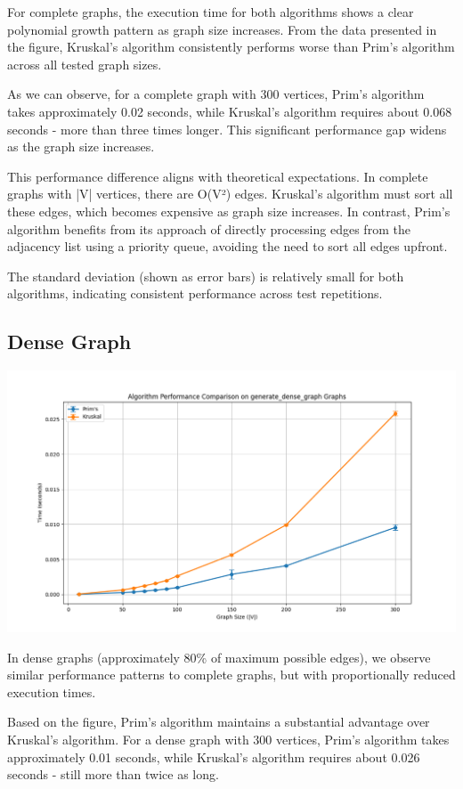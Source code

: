 \documentclass[a4paper,12pt]{article}
\begin{document}
For complete graphs, the execution time for both algorithms shows a clear polynomial growth pattern as graph size increases. From the data presented in the figure, Kruskal's algorithm consistently performs worse than Prim's algorithm across all tested graph sizes.

As we can observe, for a complete graph with 300 vertices, Prim's algorithm takes approximately 0.02 seconds, while Kruskal's algorithm requires about 0.068 seconds - more than three times longer. This significant performance gap widens as the graph size increases.

This performance difference aligns with theoretical expectations. In complete graphs with |V| vertices, there are O(V²) edges. Kruskal's algorithm must sort all these edges, which becomes expensive as graph size increases. In contrast, Prim's algorithm benefits from its approach of directly processing edges from the adjacency list using a priority queue, avoiding the need to sort all edges upfront.

The standard deviation (shown as error bars) is relatively small for both algorithms, indicating consistent performance across test repetitions.
\subsection{Dense Graph}
\label{sec:org6adea03}
\begin{center}
\includegraphics[width=.9\linewidth]{mst_dense.png}
\label{org4fa743f}
\end{center}

In dense graphs (approximately 80\% of maximum possible edges), we observe similar performance patterns to complete graphs, but with proportionally reduced execution times.

Based on the figure, Prim's algorithm maintains a substantial advantage over Kruskal's algorithm. For a dense graph with 300 vertices, Prim's algorithm takes approximately 0.01 seconds, while Kruskal's algorithm requires about 0.026 seconds - still more than twice as long.
\end{document}
